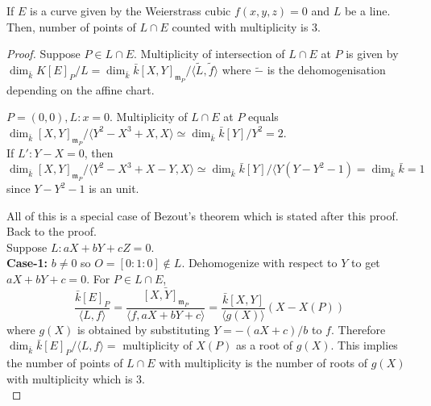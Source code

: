 \documentclass[oneside, 12pt]{scrbook}
\newcommand{\m}{\mathfrak{m}}
\theoremstyle{theorem}
\begin{document}
\begin{proposition}
If $E$ is a curve given by the Weierstrass cubic $f(x,y,z)=0$ and $L$ be a line. Then, number of points of $L \cap E$ counted with multiplicity is $3$.
\end{proposition}

\begin{proof}
Suppose $P \in L \cap E$. Multiplicity of intersection of $L \cap E$ at $P$ is given by $\dim_{\bar{k}}K[E]_{P}/L = \dim_{\bar{k}}\bar{k}[X,Y]_{\m_{P}}/\langle \tilde{L}, \tilde{f} \rangle$ where $\tilde{-}$ is the dehomogenisation depending on the affine chart.
\begin{example}
$P=(0,0), L :x=0$. Multiplicity of $L\cap E$ at $P$ equals $\dim_{\bar{k}}[X,Y]_{\m_{P}}/\langle Y^2 - X^3 + X, X\rangle \simeq \dim_{\bar{k}} \bar{k}[Y]/Y^2 = 2$. \\

If $L': Y-X=0$, then $\dim_{\bar{k}}[X,Y]_{\m_{P}}/\langle Y^2 - X^3 + X-Y, X\rangle \simeq \dim_{\bar{k}} \bar{k}[Y]/\langle Y(Y - Y^2 -1) = \dim_{\bar{k}}\bar{k}=1$ since $Y-Y^2 -1$ is an unit.
\end{example}
All of this is a special case of Bezout's theorem which is stated after this proof.\\

Back to the proof. \\

Suppose $L : aX+bY+cZ=0$.\\ 
\textbf{Case-1:} $b\neq 0$ so $O = [0:1:0] \not \in L$. Dehomogenize with respect to $Y$ to get $aX+bY+c=0$. For $P \in L \cap E$, $$\frac{\bar{k}[E]_{P}}{\langle L,f \rangle } = \frac{\bar{[X,Y]_{\m_{P}}}}{\langle f, aX+bY+c \rangle} = \frac{\bar{k}[X,Y]}{\langle g(X) \rangle} (X-X(P))$$ where $g(X)$ is obtained by substituting $Y = -(aX+c)/b$ to $f$. Therefore $\dim_{\bar{k}}\bar{k}[E]_{P}/ \langle L , f \rangle =$ multiplicity of $X(P)$ as a root of $g(X)$. This implies the number of points of $L \cap E$ with multiplicity is the number of roots of $g(X)$ with multiplicity which is $3$. \\


\end{proof}
\end{document}

